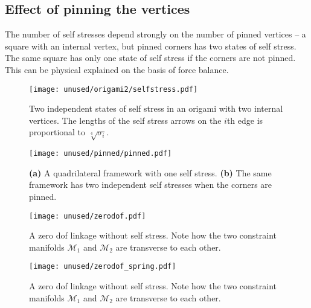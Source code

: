 \subsection{Effect of pinning the vertices}

The number of self stresses depend strongly on the number of pinned vertices -- a square with an internal vertex, but pinned corners has two states of self stress.  The same square has only one state of self stress if the corners are not pinned.
This can be physical explained on the basis of force balance.

\begin{figure}
  \begin{center}
    \texttt{[image: unused/origami2/selfstress.pdf]}
  \end{center}
  \caption{
    Two independent states of self stress in an origami with two internal vertices.
    The lengths of the self stress arrows on the $i$th edge is proportional to $\sqrt[4]{\sigma_{i}}$.
  }
  \label{fig:origami2_selfstress}
\end{figure}
%
\begin{figure}
  \begin{center}
    \texttt{[image: unused/pinned/pinned.pdf]}
  \end{center}
  \caption{
    \textsf{\textbf{(a)}} A quadrilateral framework with one self stress.
    \textsf{\textbf{(b)}} The same framework has two independent self stresses when the corners are pinned.
  }
  \label{fig:quad_pinned}
\end{figure}

\begin{figure}
  \begin{center}
    \texttt{[image: unused/zerodof.pdf]}
  \end{center}
\caption{A zero \ac{dof} linkage without self stress.  Note how the two constraint manifolds $\mathcal{M}_1$ and $\mathcal{M}_2$ are transverse to each other.}
  \label{fig:hello}
\end{figure}


\begin{figure}
  \begin{center}
    \texttt{[image: unused/zerodof\_spring.pdf]}
  \end{center}
\caption[foo]{A zero \ac{dof} linkage without self stress.  Note how the two constraint manifolds $\mathcal{M}_1$ and $\mathcal{M}_2$ are transverse to each other.}
  \label{fig:hello2}
\end{figure}
\pagebreak

